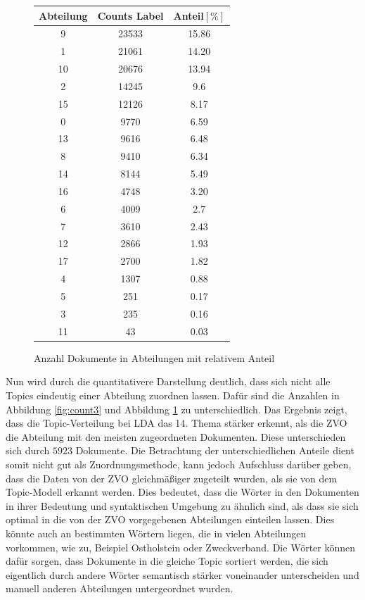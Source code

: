 \documentclass[german,version-2020-11]{uzl-thesis}
\begin{document}
\begin{itemize}
\begin{enumerate}
\begin{figure}[H]
\begin{center}
\begin{tabular}{ccc}
\hline
\hline
Abteilung & Counts Label & Anteil$[\%]$\\
\hline
9&23533&15.86\\
1&21061&14.20\\
10&20676&13.94\\
2&14245&9.6\\
15&12126&8.17\\
0&9770&6.59\\
13&9616&6.48\\
8&9410&6.34\\
14&8144&5.49\\
16&4748&3.20\\
6&4009&2.7\\
7&3610&2.43\\
12&2866&1.93\\
17&2700&1.82\\
4&1307&0.88\\
5&251& 0.17\\
3&235&0.16\\
11&43&0.03\\
\hline
\hline
\end{tabular}
\caption{Anzahl Dokumente in Abteilungen mit relativem Anteil}
\label{fig:count4}
\end{center}
\end{figure}


Nun wird durch die quantitativere Darstellung deutlich, dass sich nicht alle Topics eindeutig einer Abteilung zuordnen lassen. Dafür sind die Anzahlen in Abbildung \ref{fig:count3} und Abbildung \ref{fig:count4} zu unterschiedlich. Das Ergebnis zeigt, dass die Topic-Verteilung bei LDA das 14. Thema stärker erkennt, als die ZVO die Abteilung mit den meisten zugeordneten Dokumenten. Diese unterschieden sich durch $5923$ Dokumente. Die Betrachtung der unterschiedlichen Anteile dient somit nicht gut als Zuordnungsmethode, kann jedoch Aufschluss darüber geben, dass die Daten von der ZVO gleichmäßiger zugeteilt wurden, als sie von dem Topic-Modell erkannt werden. Dies bedeutet, dass die Wörter in den Dokumenten in ihrer Bedeutung und syntaktischen Umgebung zu ähnlich sind, als dass sie sich optimal in die von der ZVO vorgegebenen Abteilungen einteilen lassen. Dies könnte auch an bestimmten Wörtern liegen, die in vielen Abteilungen vorkommen, wie zu, Beispiel Ostholstein oder Zweckverband. Die Wörter können dafür sorgen, dass Dokumente in die gleiche Topic sortiert werden, die sich eigentlich durch andere Wörter semantisch stärker voneinander unterscheiden und manuell anderen Abteilungen untergeordnet wurden.\\ 


\end{enumerate}
\end{itemize}
\end{document}

